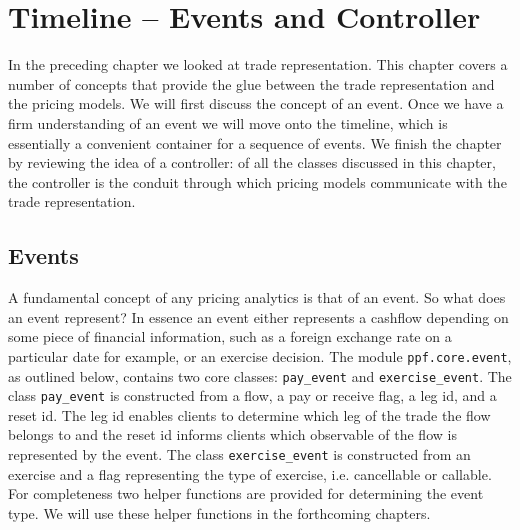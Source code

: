 \chapter{Timeline -- Events and
Controller}\label{ch:timeline-events-context}
In the preceding chapter we looked at trade representation. This
chapter covers a number of concepts that provide the glue between the
trade representation and the pricing models. We will first discuss the
concept of an event. Once we have a firm understanding of an event we
will move onto the timeline, which is essentially a convenient
container for a sequence of events. We finish the chapter by reviewing
the idea of a controller: of all the classes discussed in this
chapter, the controller is the conduit through which pricing models
communicate with the trade representation.
 
\section{Events}

A fundamental concept of any pricing analytics is that of an event. So
what does an event represent? In essence an event either represents a
cashflow depending on some piece of financial information, such as a
foreign exchange rate on a particular date for example, or an exercise
decision. The module \verb|ppf.core.event|, as outlined below,
contains two core classes: \verb|pay_event| and \verb|exercise_event|.
The class \verb|pay_event| is constructed from a flow, a pay or
receive flag, a leg id, and a reset id. The leg id enables clients to
determine which leg of the trade the flow belongs to and the reset id
informs clients which observable of the flow is represented by the
event. The class \verb|exercise_event| is constructed from an exercise
and a flag representing the type of exercise, i.e. cancellable or
callable. For completeness two helper functions are provided for
determining the event type. We will use these helper functions in the
forthcoming chapters.
   
